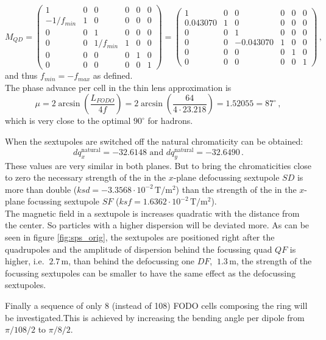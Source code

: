 \begin{equation}
    M_{QD}=\begin{pmatrix}
    1&0&0&0&0&0\\
    -1/f_{min}&1&0&0&0&0\\
    0&0&1&0&0&0\\
    0&0&1/f_{min}&1&0&0\\
    0&0&0&0&1&0\\
    0&0&0&0&0&1
    \end{pmatrix}=
    \begin{pmatrix}
    1&0&0&0&0&0\\
    0.043070&1&0&0&0&0\\
    0&0&1&0&0&0\\
    0&0&-0.043070&1&0&0\\
    0&0&0&0&1&0\\
    0&0&0&0&0&1
    \end{pmatrix}\,,
\end{equation}
and thus $f_{min}=-f_{max}$ as defined.\\
The phase advance per cell in the thin lens approximation is $$\mu=2\arcsin\left(\frac{L_{FODO}}{4f}\right)=2\arcsin\left(\frac{64}{4\cdot 23.218}\right)=1.52055=87^\circ\,,$$
which is very close to the optimal $90^\circ$ for hadrons.
\par
When the sextupoles are switched off the natural chromaticity can be obtained:$$dq_x^{\mathrm{natural}}=-32.6148\text{ and }dq_y^{\mathrm{natural}}=-32.6490\,.$$
These values are very similar in both planes. But to bring the chromaticities close to zero the necessary strength of the in the $x$-plane defocussing sextupole $SD$ is more than double ($ksd=-3.3568\cdot10^{-2}\,\mathrm{T/m^2}$) than the strength of the in the $x$-plane focussing sextupole $SF$ ($ksf=1.6362\cdot10^{-2}\,\mathrm{T/m^2}$).\\
The magnetic field in a sextupole is increases quadratic with the distance from the center.
So particles with a higher dispersion will be deviated more.
As can be seen in figure \ref{fig:sps_orig}, the sextupoles are positioned right after the quadrupoles and the amplitude of dispersion behind the focussing quad $QF$ is higher, i.e. $~2.7\,\mathrm{m}$, than behind the defocussing one $DF$, $~1.3\,\mathrm{m}$, the strength of the focussing sextupoles can be smaller to have the same effect as the defocussing sextupoles.
\par
Finally a sequence of only 8 (instead of 108) FODO cells composing the ring will be investigated.This is achieved by increasing the bending angle per dipole from $\pi/108/2$ to $\pi/8/2$.\\
